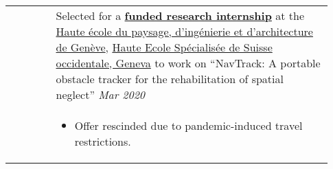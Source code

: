 \documentclass[letterpaper, 10pt, oneside]{article}
\begin{document}
\begin{longtable}{@{} p{0.13\linewidth} p{0.8\linewidth}}
                         & Selected for a \href{https://drive.google.com/file/d/1Rtlu6aHQKXntWhfEUcgB5tuNYMuvH04b}{\textbf{funded research internship}}
    at the \href{https://www.hesge.ch/hepia/}{Haute école du paysage, d'ingénierie et d'architecture de Genève}, \href{https://www.hesge.ch/geneve}{Haute Ecole Spécialisée de Suisse occidentale, Geneva}
    to work on ``NavTrack: A portable obstacle tracker for the rehabilitation of spatial neglect''           \hfill \textsl{Mar 2020}                                                                                                                    \\
                         & \parbox{0.8\textwidth}{                                                                                                                                                                                                       %
        \begin{itemize}[leftmargin=6ex, itemsep=-0.88ex, topsep=-0.88ex]
            \item Offer rescinded due to pandemic-induced travel restrictions. \\
        \end{itemize}
    }
\end{longtable}
\end{document}
